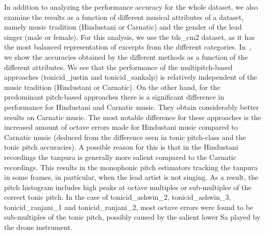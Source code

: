 {In addition to analyzing the performance accuracy for the whole dataset, we also examine the results as a function of different musical attributes of a dataset, namely music tradition (Hindustani or Carnatic) and the gender of the lead singer (male or female). For this analysis, we use the \acrshort{tds_cm2} dataset, as it has the most balanced representation of excerpts from the different categories. In~, we show the accuracies obtained by the different methods as a function of the different attributes. We see that the performance of the multipitch-based approaches (\acrshort{tonicid_justin} and \acrshort{tonicid_sankalp}) is relatively independent of the music tradition (Hindustani or Carnatic). On the other hand, for the predominant pitch-based approaches there is a significant difference in performance for Hindustani and Carnatic music. They obtain considerably better results on Carnatic music. The most notable difference for these approaches is the increased amount of octave errors made for Hindustani music compared to Carnatic music (deduced from the difference seen in tonic pitch-class and the tonic pitch accuracies). A possible reason for this is that in the Hindustani recordings the \gls{tanpura} is generally more salient compared to the Carnatic recordings. This results in the monophonic pitch estimators tracking the \gls{tanpura} in some frames, in particular, when the lead artist is not singing. As a result, the pitch histogram includes high peaks at octave multiples or sub-multiples of the correct tonic pitch. In the case of \acrshort{tonicid_ashwin_2}, \acrshort{tonicid_ashwin_3}, \acrshort{tonicid_ranjani_1} and \acrshort{tonicid_ranjani_2}, most octave errors were found to be sub-multiples of the tonic pitch, possibly caused by the salient lower Sa played by the drone instrument.

}
